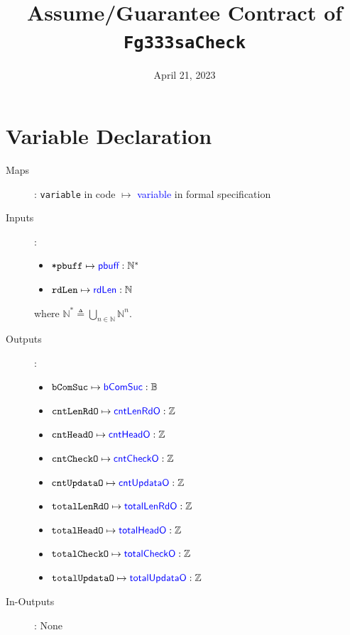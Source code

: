 \documentclass[fleqn,a4paper]{article}
\newcommand\var[1]{\texttt{#1}}
\newcommand\Var[1]{\textcolor{blue}{\textsf{#1}}}
\begin{document}
\title{Assume/Guarantee Contract of \texttt{Fg333saCheck}}
\author{}

\date{April 21, 2023}

\maketitle

\section{Variable Declaration}

\begin{description}

\item[Maps]:
\var{variable} in code $\mapsto$ \Var{variable} in formal specification

\item[Inputs]:
\begin{itemize}
\item $\var{*pbuff} \mapsto \Var{pbuff} : \mathbb{N}^*$
\item $\var{rdLen} \mapsto \Var{rdLen} : \mathbb{N}$
\end{itemize}

where $\mathbb{N}^* \triangleq \bigcup_{n\in\mathbb{N}}\mathbb{N}^n$.

\item[Outputs]:
\begin{itemize}
\item $\var{bComSuc} \mapsto \Var{bComSuc} : \mathbb{B}$
\item $\var{cntLenRdO} \mapsto \Var{cntLenRdO} : \mathbb{Z}$
\item $\var{cntHeadO} \mapsto \Var{cntHeadO} : \mathbb{Z}$
\item $\var{cntCheckO} \mapsto \Var{cntCheckO} : \mathbb{Z}$
\item $\var{cntUpdataO} \mapsto \Var{cntUpdataO} : \mathbb{Z}$
\item $\var{totalLenRdO} \mapsto \Var{totalLenRdO} : \mathbb{Z}$
\item $\var{totalHeadO} \mapsto \Var{totalHeadO} : \mathbb{Z}$
\item $\var{totalCheckO} \mapsto \Var{totalCheckO} : \mathbb{Z}$
\item $\var{totalUpdataO} \mapsto \Var{totalUpdataO} : \mathbb{Z}$
\end{itemize}

\item[In-Outputs]: None


\end{description}
\end{document}
